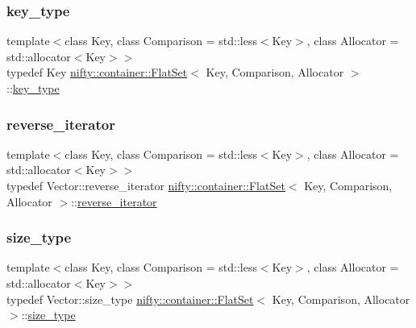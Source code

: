 \mbox{\label{classnifty_1_1container_1_1FlatSet_a0101a4574052389646be8d9bf092a949}} 
\subsubsection{\texorpdfstring{key\+\_\+type}{key\_type}}
{\footnotesize\ttfamily template$<$class Key, class Comparison = std\+::less$<$\+Key$>$, class Allocator = std\+::allocator$<$\+Key$>$$>$ \\
typedef Key \hyperlink{classnifty_1_1container_1_1FlatSet}{nifty\+::container\+::\+Flat\+Set}$<$ Key, Comparison, Allocator $>$\+::\hyperlink{classnifty_1_1container_1_1FlatSet_a0101a4574052389646be8d9bf092a949}{key\+\_\+type}}

\mbox{\label{classnifty_1_1container_1_1FlatSet_a5ad537835e3b8911ac1beed1a95d3ac2}} 
\subsubsection{\texorpdfstring{reverse\+\_\+iterator}{reverse\_iterator}}
{\footnotesize\ttfamily template$<$class Key, class Comparison = std\+::less$<$\+Key$>$, class Allocator = std\+::allocator$<$\+Key$>$$>$ \\
typedef Vector\+::reverse\+\_\+iterator \hyperlink{classnifty_1_1container_1_1FlatSet}{nifty\+::container\+::\+Flat\+Set}$<$ Key, Comparison, Allocator $>$\+::\hyperlink{classnifty_1_1container_1_1FlatSet_a5ad537835e3b8911ac1beed1a95d3ac2}{reverse\+\_\+iterator}}

\mbox{\label{classnifty_1_1container_1_1FlatSet_a06ddeba4c1be37279497ed698dfeb812}} 
\subsubsection{\texorpdfstring{size\+\_\+type}{size\_type}}
{\footnotesize\ttfamily template$<$class Key, class Comparison = std\+::less$<$\+Key$>$, class Allocator = std\+::allocator$<$\+Key$>$$>$ \\
typedef Vector\+::size\+\_\+type \hyperlink{classnifty_1_1container_1_1FlatSet}{nifty\+::container\+::\+Flat\+Set}$<$ Key, Comparison, Allocator $>$\+::\hyperlink{classnifty_1_1container_1_1FlatSet_a06ddeba4c1be37279497ed698dfeb812}{size\+\_\+type}}

